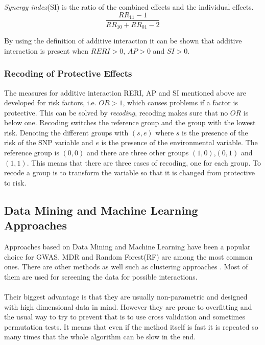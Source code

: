 \documentclass[10pt,a4paper]{report}
\begin{document}
\emph{Synergy index}(SI) is the ratio of the combined effects and the individual effects\cite{recoding_2011}.
\begin{equation}
\frac{RR_{11}-1}{RR_{10}+RR_{01}-2}
\end{equation}

By using the definition of additive interaction it can be shown that additive interaction is present when $RERI>0$, $AP>0$ and $SI>0$\cite{recoding_2011}.

\newpage
\subsubsection{Recoding of Protective Effects}
\label{recode}
The measures for additive interaction RERI, AP and SI mentioned above are developed for risk factors, i.e. $OR>1$, which causes problems if a factor is protective\cite{recoding_2011}. This can be solved by \emph{recoding}, recoding makes sure that no $OR$ is below one\cite{recoding_2011}. Recoding switches the reference group and the group with the lowest risk\cite{recoding_2011}. Denoting the different groups with $(s,e)$ where $s$ is the presence of the risk of the SNP variable and $e$ is the presence of the environmental variable. The reference group is $(0,0)$ and there are three other groups $(1,0)$,$(0,1)$ and $(1,1)$. This means that there are three cases of recoding, one for each group. To recode a group is to transform the variable so that it is changed from protective to risk.



\subsection{Data Mining and Machine Learning Approaches}
\label{data_machine_learning}
Approaches based on Data Mining and Machine Learning have been a popular choice for GWAS. MDR\cite{mdr_2001} and Random Forest(RF)\cite{random_forest} are among the most common ones\cite{gene_enviroment_2013,cordell_detect_review}. There are other methods as well such as clustering approaches \cite{fast_high_order_cluster}. Most of them are used for screening the data for possible interactions\cite{gene_enviroment_2013,cordell_detect_review}.\\
\\
Their biggest advantage is that they are usually non-parametric and designed with high dimensional data in mind. However they are prone to overfitting and the usual way to try to prevent that is to use cross validation and sometimes permutation tests. It means that even if the method itself is fast it is repeated so many times that the whole algorithm can be slow in the end.\cite{cordell_detect_review}
\end{document}
